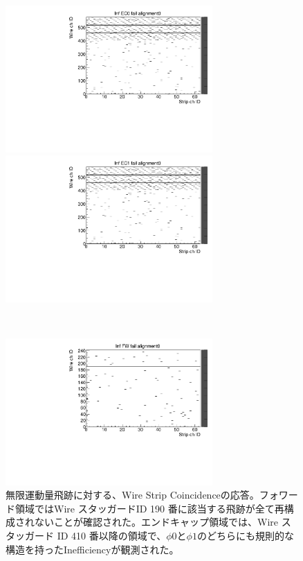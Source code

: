 \begin{figure}
    \begin{minipage}[b]{.5\linewidth}
        \centering
        \includegraphics[height=5.6cm]{fig/Test/A_InfEC0_WS.pdf}
    \end{minipage}
    \begin{minipage}[b]{.5\linewidth}
        \centering
        \includegraphics[height=5.6cm]{fig/Test/A_InfEC1_WS.pdf}
    \end{minipage}\\
    \begin{minipage}[b]{\linewidth}
        \centering
        \includegraphics[height=5.6cm]{fig/Test/A_InfFW_WS.pdf}
    \end{minipage}
    \caption[異なる画像形式の比較]{無限運動量飛跡に対する、Wire Strip Coincidenceの応答。フォワード領域ではWire スタッガードID 190 番に該当する飛跡が全て再構成されないことが確認された。エンドキャップ領域では、Wire スタッガード ID 410 番以降の領域で、$\phi0$と$\phi1$のどちらにも規則的な構造を持ったInefficiencyが観測された。}
    \label{Inf_A_WS}
\end{figure}

